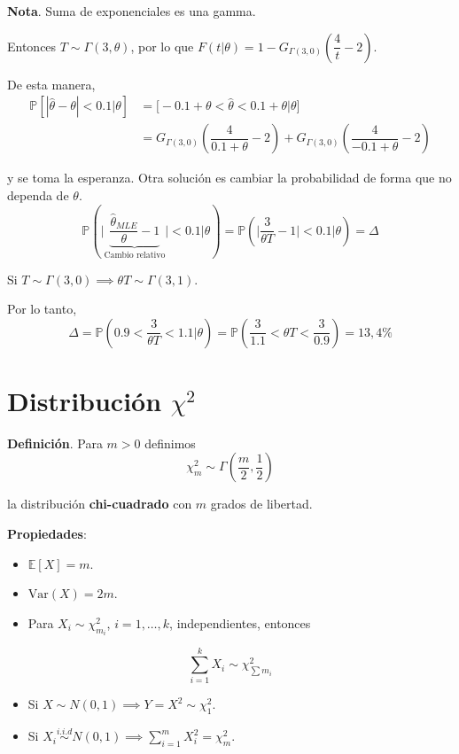 \documentclass[
  12pt,
]{book}
\begin{document}
\textbf{Nota}. Suma de exponenciales es una gamma.

Entonces \(T\sim \Gamma(3,\theta)\), por lo que \(F(t|\theta) = 1-G_{\Gamma(3,0)}\left( \dfrac 4t-2\right)\).

De esta manera,
\begin{align*} 
\mathbb P[|\hat\theta-\theta|<0.1|\theta]  & = \mathbb[-0.1+\theta < \hat\theta < 0.1 +\theta|\theta]\\
& = G_{\Gamma(3,0)}\left(\dfrac 4{0.1+\theta} - 2\right)+G_{\Gamma(3,0)}\left(\dfrac 4{-0.1+\theta} - 2\right)
\end{align*}

y se toma la esperanza. Otra solución es cambiar la probabilidad de forma que no dependa de \(\theta\).
\[\mathbb P \left(\bigg| \underbrace{\dfrac{\hat\theta_{MLE}}\theta-1}_{\text{Cambio relativo}} \bigg| < 0.1\bigg|\theta \right) = \mathbb P \left( \bigg| \dfrac{3}{\theta T}-1 \bigg| < 0.1 \bigg| \theta \right) = \Delta\]

Si \(T\sim\Gamma(3,0) \implies \theta T \sim \Gamma(3,1)\).

Por lo tanto,
\[\Delta = \mathbb P \left(0.9<\dfrac 3{\theta T}<1.1\bigg|\theta\right) = \mathbb P \left(\dfrac 3{1.1}<\theta T<\dfrac 3{0.9}\right) = 13,4\%\]

\hypertarget{distribuciuxf3n-chi2}{%
\chapter{\texorpdfstring{Distribución \(\chi^2\)}{Distribución \textbackslash chi\^{}2}}\label{distribuciuxf3n-chi2}}

\textbf{Definición}. Para \(m>0\) definimos
\[ \chi^2_m \sim \Gamma\left(\dfrac m2, \dfrac 12 \right)\]

la distribución \textbf{chi-cuadrado} con \(m\) grados de libertad.

\textbf{Propiedades}:

\begin{itemize}
\item
  \(\mathbb E[X] = m\).
\item
  \(\text{Var} (X) = 2m\).
\item
  Para \(X_i \sim \chi^2_{m_i}\), \(i = 1,\dots, k\), independientes, entonces
\end{itemize}

\[\sum_{i=1}^k X_i \sim \chi^2_{\sum m_i}\]

\begin{itemize}
\item
  Si \(X\sim N(0,1) \implies Y = X^2\sim \chi^2_1\).
\item
  Si \(X_i \stackrel{i.i.d}{\sim} N(0,1) \implies \sum_{i=1}^m X_i^2 = \chi^2_m\).
\end{itemize}
\end{document}
